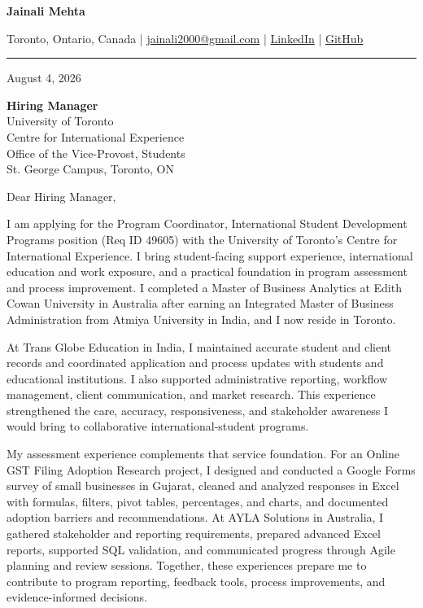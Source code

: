 \documentclass[letterpaper,10pt]{article}
\begin{document}
\begin{center}
  {\fontsize{17}{19}\selectfont\textbf{Jainali Mehta}}\par\vspace{2pt}
  \small Toronto, Ontario, Canada \;|\;
  \href{mailto:jainali2000@gmail.com}{jainali2000@gmail.com} \;|\;
  \href{https://www.linkedin.com/in/jainali-mehta}{LinkedIn} \;|\;
  \href{https://github.com/jainalimehta}{GitHub}
\end{center}
\vspace{-5pt}
\noindent\rule{\textwidth}{0.4pt}

August 4, 2026

\textbf{Hiring Manager}\\
University of Toronto\\
Centre for International Experience\\
Office of the Vice-Provost, Students\\
St. George Campus, Toronto, ON

Dear Hiring Manager,

I am applying for the Program Coordinator, International Student Development Programs position (Req ID 49605) with the University of Toronto's Centre for International Experience. I bring student-facing support experience, international education and work exposure, and a practical foundation in program assessment and process improvement. I completed a Master of Business Analytics at Edith Cowan University in Australia after earning an Integrated Master of Business Administration from Atmiya University in India, and I now reside in Toronto.

At Trans Globe Education in India, I maintained accurate student and client records and coordinated application and process updates with students and educational institutions. I also supported administrative reporting, workflow management, client communication, and market research. This experience strengthened the care, accuracy, responsiveness, and stakeholder awareness I would bring to collaborative international-student programs.

My assessment experience complements that service foundation. For an Online GST Filing Adoption Research project, I designed and conducted a Google Forms survey of small businesses in Gujarat, cleaned and analyzed responses in Excel with formulas, filters, pivot tables, percentages, and charts, and documented adoption barriers and recommendations. At AYLA Solutions in Australia, I gathered stakeholder and reporting requirements, prepared advanced Excel reports, supported SQL validation, and communicated progress through Agile planning and review sessions. Together, these experiences prepare me to contribute to program reporting, feedback tools, process improvements, and evidence-informed decisions.
\end{document}
